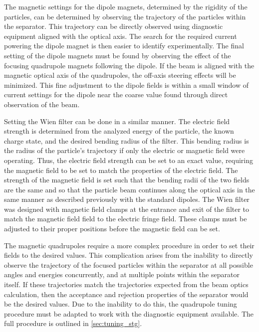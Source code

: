 The magnetic settings for the dipole magnets, determined by the rigidity
of the particles, can be determined by observing the trajectory of the
particles within the separator. This trajectory can be directly observed
using diagnostic equipment aligned with the optical axis. The search for
the required current powering the dipole magnet is then easier to
identify experimentally. The final setting of the dipole magnets must be
found by observing the effect of the focusing quadrupole magnets
following the dipole. If the beam is aligned with the magnetic optical
axis of the quadrupoles, the off-axis steering effects will be
minimized. This fine adjustment to the dipole fields is within a small
window of current settings for the dipole near the coarse value found
through direct observation of the beam.

Setting the Wien filter can be done in a similar manner. The electric
field strength is determined from the analyzed energy of the particle,
the known charge state, and the desired bending radius of the filter.
This bending radius is the radius of the particle's trajectory if only
the electric or magnetic field were operating. Thus, the electric field
strength can be set to an exact value, requiring the magnetic field to
be set to match the properties of the electric field. The strength of
the magnetic field is set such that the bending radii of the two fields
are the same and so that the particle beam continues along the optical
axis in the same manner as described previously with the standard
dipoles. The Wien filter was designed with magnetic field clamps at the
entrance and exit of the filter to match the magnetic field field to the
electric fringe field. These clamps must be adjusted to their proper
positions before the magnetic field can be set.

The magnetic quadrupoles require a more complex procedure in order to
set their fields to the desired values. This complication arises from
the inability to directly observe the trajectory of the focused
particles within the separator at all possible angles and energies
concurrently, and at multiple points within the separator itself. If
these trajectories match the trajectories expected from the beam optics
calculation, then the acceptance and rejection properties of the
separator would be the desired values. Due to the inability to do this,
the quadrupole tuning procedure must be adapted to work with the
diagnostic equipment available. The full procedure is outlined in
\ref{sec:tuning_stg}.


